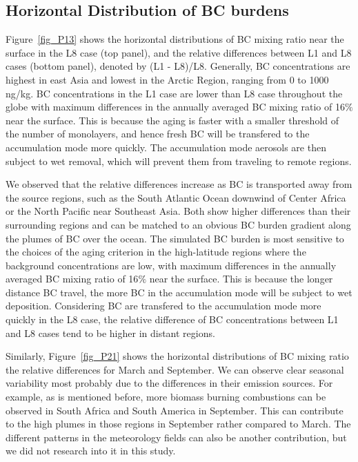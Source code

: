 \documentclass[12pt, fullpage]{uiucthesis2009}
\begin{document}
	\subsection{Horizontal Distribution of BC burdens}
	Figure~\ref{fig_P13} shows the horizontal distributions of BC mixing ratio near the surface in the L8 case (top panel), and the relative differences between L1 and L8 cases (bottom panel), denoted by (L1 - L8)/L8. Generally, BC concentrations are highest in east Asia and lowest in the Arctic Region, ranging from 0 to 1000 ng/kg. BC concentrations in the L1 case are lower than L8 case throughout the globe with maximum differences in the annually averaged BC mixing ratio of 16$\%$ near the surface. This is because the aging is faster with a smaller threshold of the number of monolayers, and hence fresh BC will be transfered to the accumulation mode more quickly. The accumulation mode aerosols are then subject to wet removal, which will prevent them from traveling to remote regions.     
	
	We observed that the relative differences increase as BC is transported away from the source regions, such as the South Atlantic Ocean downwind of Center Africa or the North Pacific near Southeast Asia. Both show higher differences than their surrounding regions and can be matched to an obvious BC burden gradient along the plumes of BC over the ocean. The simulated BC burden is most sensitive to the choices of the aging criterion in the high-latitude regions where the background concentrations are low, with maximum differences in the annually averaged BC mixing ratio of 16$\%$ near the surface. This is because the longer distance BC travel, the more BC in the accumulation mode will be subject to wet deposition. Considering BC are transfered to the accumulation mode more quickly in the L8 case, the relative difference of BC concentrations between L1 and L8 cases tend to be higher in distant regions.
	
	Similarly, Figure~\ref{fig_P21} shows the horizontal distributions of BC mixing ratio the relative differences for March and September. We can observe clear seasonal variability most probably due to the differences in their emission sources. For example, as is mentioned before, more biomass burning combustions can be observed in South Africa and South America in September. This can contribute to the high plumes in those regions in September rather compared to March. The different patterns in the meteorology fields can also be another contribution, but we did not research into it in this study.
	
\end{document}
